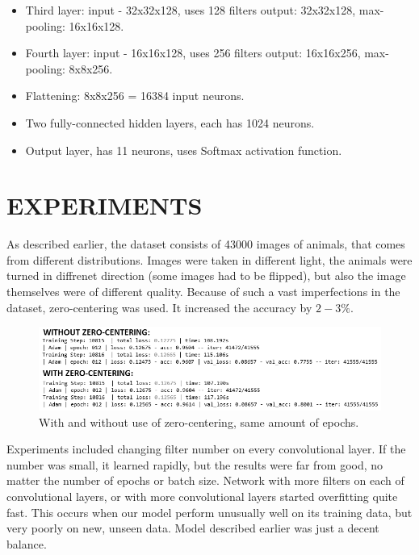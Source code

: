 \documentclass[conference]{IEEEtran}
\begin{document}
\begin{enumerate}
\begin{itemize}
        \item Third layer: input - 32x32x128, uses 128 filters output: 32x32x128, max-pooling: 16x16x128.
        \item Fourth layer: input - 16x16x128, uses 256 filters output: 16x16x256, max-pooling: 8x8x256.
        \item Flattening: 8x8x256 = 16384 input neurons.
        \item Two fully-connected hidden layers, each has 1024 neurons.
        \item Output layer, has 11 neurons, uses Softmax activation function.
    \end{itemize}
\end{enumerate}

\section{EXPERIMENTS}

As described earlier, the dataset consists of 43000 images of animals, that comes from different distributions. Images were taken in different light, the animals were turned in diffrenet direction (some images had to be flipped), but also the image themselves were of different quality. Because of such a vast imperfections in the dataset, zero-centering was used. It increased the accuracy by $2-3\%$.

\begin{figure}[hbt!]
 \centering
    \includegraphics[scale=0.46]{adam_zc-b.png}
        \caption{With and without use of zero-centering, same amount of epochs.}
	    \label{fig:my_label}
\end{figure}

Experiments included changing filter number on every convolutional layer. If the number was small, it learned rapidly, but the results were far from good, no matter the number of epochs or batch size.
Network with more filters on each of convolutional layers, or with more convolutional layers started overfitting quite fast. This occurs when our model perform unusually well on its training data, but very poorly on new, unseen data. Model described earlier was just a decent balance.
\end{document}
